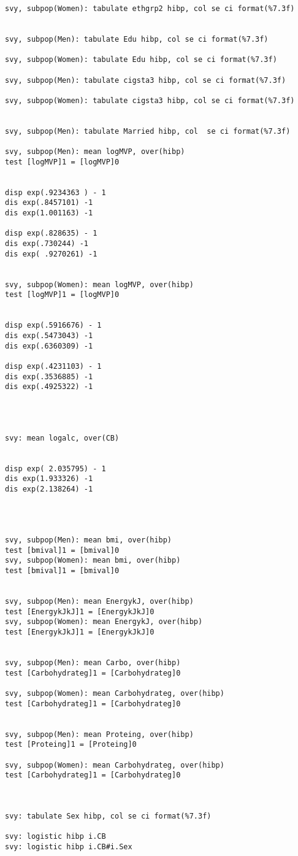 \documentclass[]{article}
\begin{document}
\begin{verbatim}
svy, subpop(Women): tabulate ethgrp2 hibp, col se ci format(%7.3f)


svy, subpop(Men): tabulate Edu hibp, col se ci format(%7.3f)

svy, subpop(Women): tabulate Edu hibp, col se ci format(%7.3f)

svy, subpop(Men): tabulate cigsta3 hibp, col se ci format(%7.3f)

svy, subpop(Women): tabulate cigsta3 hibp, col se ci format(%7.3f)


svy, subpop(Men): tabulate Married hibp, col  se ci format(%7.3f)

svy, subpop(Men): mean logMVP, over(hibp)
test [logMVP]1 = [logMVP]0


disp exp(.9234363 ) - 1    
dis exp(.8457101) -1 
dis exp(1.001163) -1

disp exp(.828635) - 1    
dis exp(.730244) -1 
dis exp( .9270261) -1


svy, subpop(Women): mean logMVP, over(hibp) 
test [logMVP]1 = [logMVP]0


disp exp(.5916676) - 1    
dis exp(.5473043) -1 
dis exp(.6360309) -1

disp exp(.4231103) - 1    
dis exp(.3536885) -1 
dis exp(.4925322) -1




svy: mean logalc, over(CB)


disp exp( 2.035795) - 1    
dis exp(1.933326) -1 
dis exp(2.138264) -1




svy, subpop(Men): mean bmi, over(hibp)
test [bmival]1 = [bmival]0
svy, subpop(Women): mean bmi, over(hibp)
test [bmival]1 = [bmival]0


svy, subpop(Men): mean EnergykJ, over(hibp)
test [EnergykJkJ]1 = [EnergykJkJ]0
svy, subpop(Women): mean EnergykJ, over(hibp)
test [EnergykJkJ]1 = [EnergykJkJ]0

    
svy, subpop(Men): mean Carbo, over(hibp)
test [Carbohydrateg]1 = [Carbohydrateg]0

svy, subpop(Women): mean Carbohydrateg, over(hibp)
test [Carbohydrateg]1 = [Carbohydrateg]0


svy, subpop(Men): mean Proteing, over(hibp)
test [Proteing]1 = [Proteing]0

svy, subpop(Women): mean Carbohydrateg, over(hibp)
test [Carbohydrateg]1 = [Carbohydrateg]0



svy: tabulate Sex hibp, col se ci format(%7.3f)

svy: logistic hibp i.CB
svy: logistic hibp i.CB#i.Sex


\end{verbatim}
\end{document}
